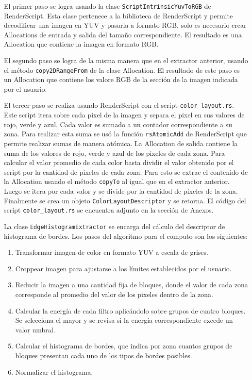 El primer paso se logra usando la clase \texttt{ScriptIntrinsicYuvToRGB} de RenderScript. Esta clase pertenece a la biblioteca de RenderScript y permite decodificar una imagen en YUV y pasarla a formato RGB, solo es necesario crear Allocations de entrada y salida del tamaño correspondiente. El resultado es una Allocation que contiene la imagen en formato RGB.

El segundo paso se logra de la misma manera que en el extractor anterior, usando el método \texttt{copy2DRangeFrom} de la clase Allocation. El resultado de este paso es un Allocation que contiene los valore RGB de la sección de la imagen indicada por el usuario.

El tercer paso se realiza usando RenderScript con el script \texttt{color\_layout.rs}. Este script itera sobre cada pixel de la imagen y separa el pixel en sus valores de rojo, verde y azul. Cada valor es sumado a un contador correspondiente a su zona. Para realizar esta suma se usó la función \texttt{rsAtomicAdd} de RenderScript que permite realizar sumas de manera atómica. La Allocation de salida contiene la suma de los valores de rojo, verde y azul de los pixeles de cada zona. Para calcular el valor promedio de cada color basta dividir el valor obtenido por el script por la cantidad de pixeles de cada zona. Para esto se extrae el contenido de la Allocation usando el método \texttt{copyTo} al igual que en el extractor anterior. Luego se itera por cada valor y se divide por la cantidad de pixeles de la zona. Finalmente se crea un objeto \texttt{ColorLayoutDescriptor} y se retorna. El código del script \texttt{color\_layout.rs} se encuentra adjunto en la sección de Anexos.
 
La clase \texttt{EdgeHistogramExtractor} se encarga del cálculo del descriptor de histograma de bordes. Los pasos del algoritmo para el computo son los siguientes:
\begin{enumerate}
\item Transformar imagen de color en formato YUV a escala de grises.
\item Croppear imagen para ajustarse a los límites establecidos por el usuario.
\item Reducir la imagen a una cantidad fija de bloques, donde el valor de cada zona corresponde al promedio del valor de los pixeles dentro de la zona.
\item Calcular la energía de cada filtro aplicándolo sobre grupos de cuatro bloques. Se selecciona el mayor y se revisa si la energía correspondiente excede un valor umbral.
\item Calcular el histograma de bordes, que indica por zona cuantos grupos de bloques presentan cada uno de los tipos de bordes posibles.
\item Normalizar el histograma.
\end{enumerate}


